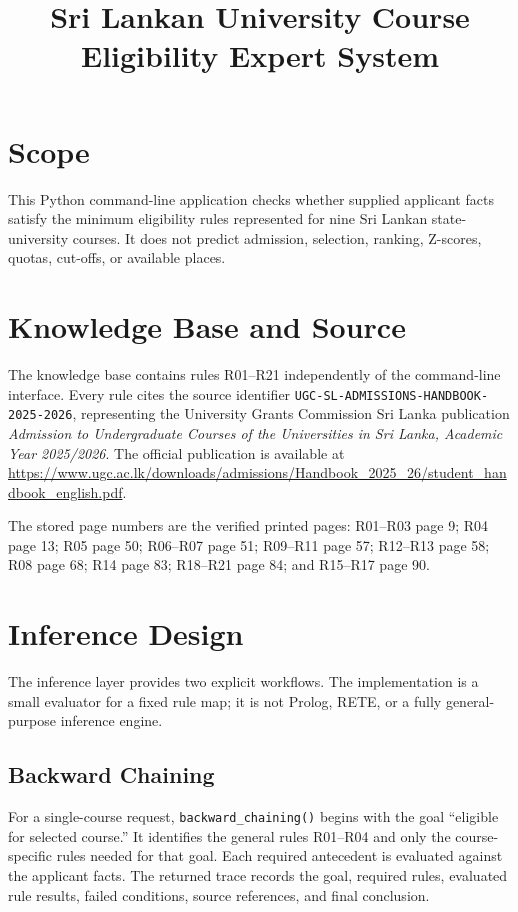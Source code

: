 \documentclass[11pt]{article}
\title{Sri Lankan University Course Eligibility Expert System}
\author{}
\date{}
\begin{document}
\maketitle

\section{Scope}

This Python command-line application checks whether supplied applicant facts
satisfy the minimum eligibility rules represented for nine Sri Lankan
state-university courses. It does not predict admission, selection, ranking,
Z-scores, quotas, cut-offs, or available places.

\section{Knowledge Base and Source}

The knowledge base contains rules R01--R21 independently of the command-line
interface. Every rule cites the source identifier
\texttt{UGC-SL-ADMISSIONS-HANDBOOK-2025-2026}, representing the University
Grants Commission Sri Lanka publication \emph{Admission to Undergraduate
Courses of the Universities in Sri Lanka, Academic Year 2025/2026}. The
official publication is available at
\url{https://www.ugc.ac.lk/downloads/admissions/Handbook_2025_26/student_handbook_english.pdf}.

The stored page numbers are the verified printed pages: R01--R03 page 9; R04
page 13; R05 page 50; R06--R07 page 51; R09--R11 page 57; R12--R13 page 58;
R08 page 68; R14 page 83; R18--R21 page 84; and R15--R17 page 90.

\section{Inference Design}

The inference layer provides two explicit workflows. The implementation is a
small evaluator for a fixed rule map; it is not Prolog, RETE, or a fully
general-purpose inference engine.

\subsection{Backward Chaining}

For a single-course request, \texttt{backward\_chaining()} begins with the goal
``eligible for selected course.'' It identifies the general rules R01--R04 and
only the course-specific rules needed for that goal. Each required antecedent
is evaluated against the applicant facts. The returned trace records the goal,
required rules, evaluated rule results, failed conditions, source references,
and final conclusion.
\end{document}

